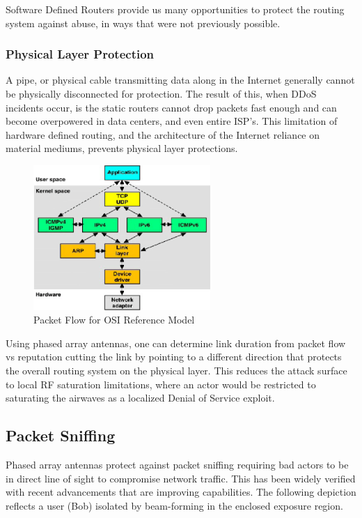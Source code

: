 \documentclass[11pt]{article}
\begin{document}
\noindent Software Defined Routers provide us many opportunities to protect the routing system against abuse, in ways that were not previously possible.


\subsubsection{Physical Layer Protection}

A pipe, or physical cable transmitting data along in the Internet generally cannot be physically disconnected for protection. 
The result of this, when DDoS incidents occur, is the static routers cannot drop packets fast enough and can become overpowered in data centers, and even entire ISP's.
This limitation of hardware defined routing, and the architecture of the Internet reliance on material mediums, prevents physical layer protections.

\pagebreak
\begin{figure}[h]
    \centering
    \includegraphics[width=0.6\textwidth]{./images/rsz_packet_flow.png}
    \caption{Packet Flow for OSI Reference Model \cite{Packet-flow}}
\end{figure}

\noindent Using phased array antennas, one can determine link duration from packet flow vs reputation cutting the link by pointing to a different direction that protects the overall routing system on the physical layer.
This reduces the attack surface to local RF saturation limitations, where an actor would be restricted to saturating the airwaves as a localized Denial of Service exploit.


\subsection{Packet Sniffing}
\label{packet-sniffing}

Phased array antennas protect against packet sniffing requiring bad actors to be in direct line of sight to compromise network traffic.  
This has been widely verified \cite{Beamform-sec} with recent advancements that are improving capabilities. 
The following depiction reflects a user (Bob) isolated by beam-forming in the enclosed exposure region.
\end{document}
